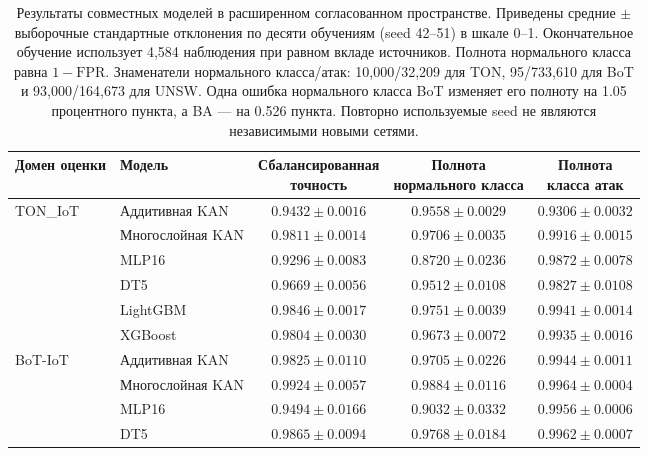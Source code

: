 
\begin{table}[t]
\centering
\caption{Результаты совместных моделей в расширенном согласованном пространстве. Приведены средние $\pm$ выборочные стандартные отклонения по десяти обучениям (seed 42--51) в шкале 0--1. Окончательное обучение использует 4,584 наблюдения при равном вкладе источников. Полнота нормального класса равна $1-\mathrm{FPR}$. Знаменатели нормального класса/атак: 10,000/32,209 для TON, 95/733,610 для BoT и 93,000/164,673 для UNSW. Одна ошибка нормального класса BoT изменяет его полноту на 1.05 процентного пункта, а BA --- на 0.526 пункта. Повторно используемые seed не являются независимыми новыми сетями.}
\label{tab:supp-joint-recalls}
\footnotesize
\setlength{\tabcolsep}{4pt}
\begin{tabular}{llccc}
\toprule
Домен оценки & Модель & \shortstack{Сбалансированная\\точность} & \shortstack{Полнота\\нормального класса} & \shortstack{Полнота\\класса атак} \\
\midrule
TON\_IoT & Аддитивная KAN & $0.9432 \pm 0.0016$ & $0.9558 \pm 0.0029$ & $0.9306 \pm 0.0032$ \\
 & Многослойная KAN & $0.9811 \pm 0.0014$ & $0.9706 \pm 0.0035$ & $0.9916 \pm 0.0015$ \\
 & MLP16 & $0.9296 \pm 0.0083$ & $0.8720 \pm 0.0236$ & $0.9872 \pm 0.0078$ \\
 & DT5 & $0.9669 \pm 0.0056$ & $0.9512 \pm 0.0108$ & $0.9827 \pm 0.0108$ \\
 & LightGBM & $0.9846 \pm 0.0017$ & $0.9751 \pm 0.0039$ & $0.9941 \pm 0.0014$ \\
 & XGBoost & $0.9804 \pm 0.0030$ & $0.9673 \pm 0.0072$ & $0.9935 \pm 0.0016$ \\
\midrule
BoT-IoT & Аддитивная KAN & $0.9825 \pm 0.0110$ & $0.9705 \pm 0.0226$ & $0.9944 \pm 0.0011$ \\
 & Многослойная KAN & $0.9924 \pm 0.0057$ & $0.9884 \pm 0.0116$ & $0.9964 \pm 0.0004$ \\
 & MLP16 & $0.9494 \pm 0.0166$ & $0.9032 \pm 0.0332$ & $0.9956 \pm 0.0006$ \\
 & DT5 & $0.9865 \pm 0.0094$ & $0.9768 \pm 0.0184$ & $0.9962 \pm 0.0007$ \\

\end{tabular}
\end{table}
